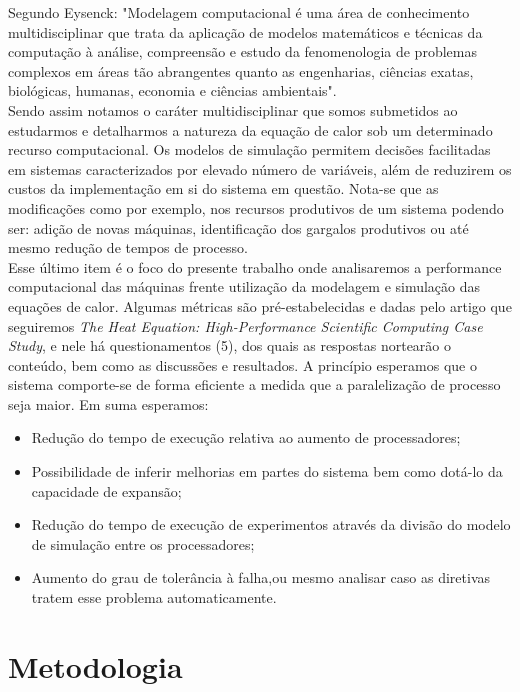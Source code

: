 \documentclass[letterpaper, 10 pt, conference]{ieeeconf}
\begin{document}
Segundo Eysenck: "Modelagem computacional é uma área de conhecimento multidisciplinar que trata da aplicação de modelos matemáticos e técnicas da computação à análise, 
compreensão e estudo da fenomenologia de problemas complexos em áreas tão abrangentes quanto as engenharias, ciências exatas, biológicas, humanas, economia e ciências 
ambientais".\\
Sendo assim notamos o caráter multidisciplinar que somos submetidos ao estudarmos e detalharmos a natureza da equação de 
calor sob um determinado recurso computacional. 
Os modelos de simulação permitem decisões facilitadas em sistemas caracterizados por elevado número de variáveis, além de  reduzirem os custos da implementação em si do sistema 
em questão. Nota-se que as modificações como por exemplo, nos recursos produtivos de um sistema podendo ser: adição de novas máquinas, identificação dos gargalos produtivos ou 
até mesmo redução de tempos de processo. \\
Esse último item é o foco do presente trabalho onde analisaremos a performance computacional das máquinas frente utilização da modelagem e simulação das equações de calor. 
Algumas métricas são pré-estabelecidas e dadas pelo artigo que seguiremos \textit{The Heat Equation: High-Performance Scientific Computing Case Study}, e nele há questionamentos 
(5), dos quais as respostas nortearão o conteúdo, bem como as discussões e resultados.  A princípio esperamos que o sistema comporte-se de forma eficiente a medida que a paralelização de processo seja maior. Em 
suma esperamos:
\begin{itemize}
    \item Redução do tempo de execução relativa ao aumento de processadores;
    \item Possibilidade de inferir melhorias em partes do sistema bem como dotá-lo  da capacidade de expansão; 
    \item Redução do tempo de execução de experimentos através da divisão do modelo de simulação entre os processadores;
    \item Aumento do grau de tolerância à falha,ou mesmo analisar caso as diretivas tratem esse problema automaticamente. 
\end{itemize}

\section{Metodologia}
\end{document}
